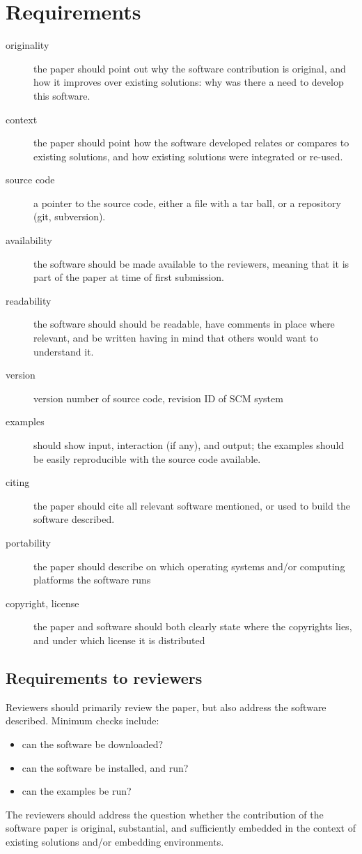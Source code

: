 \documentclass{article}
\begin{document}
\section{Requirements}
\begin{description}
\item[originality] the paper should point out why the software contribution
is original, and how it improves over existing solutions: why was there
a need to develop this software.
\item[context] the paper should point how the software developed
relates or compares to existing solutions, and how existing solutions
were integrated or re-used.
\item[source code] a pointer to the source code, either a file with
a tar ball, or a repository (git, subversion).
\item [availability] the software should be made available to the 
reviewers, meaning that it is part of the paper at time of first
submission.
\item[readability] the software should should be readable, have comments
in place where relevant, and be written having in mind that others would
want to understand it.
\item[version] version number of source code, revision ID of SCM system
\item[examples] should show input, interaction (if any), and output;
the examples should be easily reproducible with the source code available.
\item[citing] the paper should cite all relevant software mentioned, 
or used to build the software described.
\item[portability] the paper should describe on which operating systems
and/or computing platforms the software runs
\item[copyright, license] the paper and software should both
clearly state where the copyrights lies, and under which license
it is distributed

\end{description}

\subsection{Requirements to reviewers}
Reviewers should primarily review the paper, but also address the
software described. Minimum checks include:
\begin{itemize}
\item can the software be downloaded?
\item can the software be installed, and run?
\item can the examples be run?
\end{itemize}
The reviewers should address the question whether the contribution
of the software paper is original, substantial, and sufficiently
embedded in the context of existing solutions and/or embedding
environments.
\end{document}
